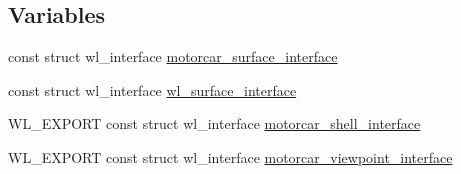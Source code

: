 \subsection*{Variables}
\begin{DoxyCompactItemize}
\item 
const struct wl\-\_\-interface \hyperlink{clients_2simple-egl_2motorcar-wayland-extensions_8c_a56acb8594d0103b3705453e8ea77915b}{motorcar\-\_\-surface\-\_\-interface}
\item 
const struct wl\-\_\-interface \hyperlink{clients_2simple-egl_2motorcar-wayland-extensions_8c_ab5b94bcc25b21d2fdd945533016d0e33}{wl\-\_\-surface\-\_\-interface}
\item 
W\-L\-\_\-\-E\-X\-P\-O\-R\-T const struct wl\-\_\-interface \hyperlink{clients_2simple-egl_2motorcar-wayland-extensions_8c_af93f16d847b10210463edbe6017b9517}{motorcar\-\_\-shell\-\_\-interface}
\item 
W\-L\-\_\-\-E\-X\-P\-O\-R\-T const struct wl\-\_\-interface \hyperlink{clients_2simple-egl_2motorcar-wayland-extensions_8c_a75e24dc8eb5259b6e2ec9ac54c4a201b}{motorcar\-\_\-viewpoint\-\_\-interface}
\end{DoxyCompactItemize}


